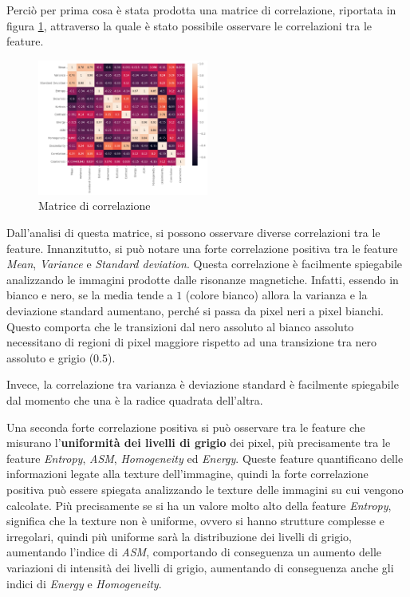 Perciò per prima cosa è stata prodotta una matrice di correlazione, riportata in
figura \ref{fig:corr-matrix}, attraverso la quale è stato possibile osservare le
correlazioni tra le feature.
\begin{figure}[!ht]
      \centering
      \includegraphics[width=0.5\textwidth]{img/analisi/corr.png}
      \caption{Matrice di correlazione}
      \label{fig:corr-matrix}
\end{figure}

Dall'analisi di questa matrice, si possono osservare diverse correlazioni tra le
feature. Innanzitutto, si può notare una forte correlazione positiva tra le
feature \textit{Mean}, \textit{Variance} e \textit{Standard deviation}. Questa
correlazione è facilmente spiegabile analizzando le immagini prodotte dalle
risonanze magnetiche. Infatti, essendo in bianco e nero, se la media tende a $1$
(colore bianco) allora la varianza e la deviazione standard aumentano, perché si
passa da pixel neri a pixel bianchi. Questo comporta che le transizioni dal nero
assoluto al bianco assoluto necessitano di regioni di pixel maggiore rispetto
ad una transizione tra nero assoluto e grigio ($0.5$).

Invece, la correlazione tra varianza è deviazione standard è facilmente spiegabile
dal momento che una è la radice quadrata dell'altra.

Una seconda forte correlazione positiva si può osservare tra le feature che
misurano l'\textbf{uniformità dei livelli di grigio} dei pixel, più precisamente
tra le feature \textit{Entropy}, \textit{ASM}, \textit{Homogeneity} ed
\textit{Energy}. Queste feature quantificano delle informazioni legate alla
texture dell'immagine, quindi la forte correlazione positiva può essere spiegata
analizzando le texture delle immagini su cui vengono calcolate. Più precisamente
se si ha un valore molto alto della feature \textit{Entropy}, significa che la
texture non è uniforme, ovvero si hanno strutture complesse e irregolari, quindi
più uniforme sarà la distribuzione dei livelli di grigio, aumentando l'indice
di \textit{ASM}, comportando di conseguenza un aumento delle variazioni di intensità
dei livelli di grigio, aumentando di conseguenza anche gli indici di \textit{Energy}
e \textit{Homogeneity}.

